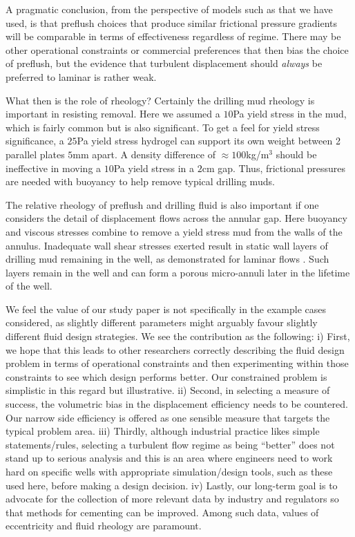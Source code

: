\documentclass[review]{elsarticle}
\begin{document}
A pragmatic conclusion, from the perspective of models such as that we have used, is that preflush choices that produce similar frictional pressure gradients will be comparable in terms of effectiveness regardless of regime. There may be other operational constraints or commercial preferences that then bias the choice of preflush, but the evidence that turbulent displacement should \emph{always} be preferred to laminar is rather weak.

What then is the role of rheology? Certainly the drilling mud rheology is important in resisting removal. Here we assumed a $10$Pa yield stress in the mud, which is fairly common but is also significant. To get a feel for yield stress significance, a $25$Pa yield stress hydrogel can support its own weight between 2 parallel plates $5$mm apart. A density difference of $\approx 100$kg/m$^3$ should be ineffective in moving a $10$Pa yield stress in a $2$cm gap. Thus, frictional pressures are needed with buoyancy to help remove typical drilling muds.

The relative rheology of preflush and drilling fluid is also important if one considers the detail of displacement flows across the annular gap. Here buoyancy and viscous stresses combine to remove a yield stress mud from the walls of the annulus. Inadequate wall shear stresses exerted result in static wall layers of drilling mud remaining in the well, as demonstrated for laminar flows \citep{Zare2017,Zare2018}. Such layers remain in the well and can form a porous micro-annuli later in the lifetime of the well.

We feel the value of our study paper is not specifically in the example cases considered, as slightly different parameters might arguably favour slightly different fluid design strategies. We see the contribution as the following: i) First, we hope that this leads to other researchers correctly describing the fluid design problem in terms of operational constraints and then experimenting within those constraints to see which design performs better. Our constrained problem is simplistic in this regard but illustrative. ii) Second, in selecting a measure of success, the volumetric bias in the displacement efficiency needs to be countered. Our narrow side efficiency is offered as one sensible measure that targets the typical problem area. iii) Thirdly, although industrial practice likes simple statements/rules, selecting a turbulent flow regime as being ``better'' does not stand up to serious analysis and this is an area where engineers need to work hard on specific wells with appropriate simulation/design tools, such as these used here, before making a design decision. iv) Lastly, our long-term goal is to advocate for the collection of more relevant data by industry and regulators so that methods for cementing can be improved. Among such data, values of eccentricity and fluid rheology are paramount.
\end{document}
